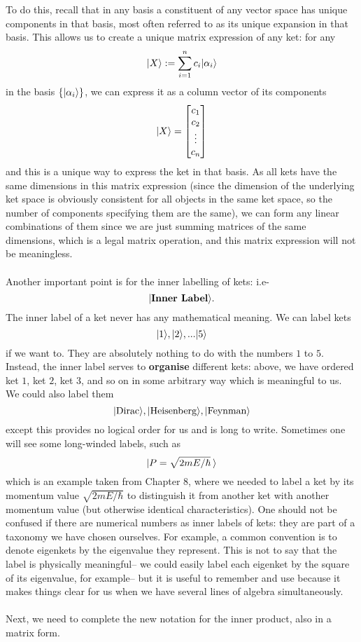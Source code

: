 \\\\
To do this, recall that in any basis a constituent of any vector space has unique components in that basis, most often referred to as its unique expansion in that basis. This allows us to create a unique matrix expression of any ket: for any
$$
|X\rangle:=\sum_{i=1}^{n}c_{i}|\alpha_{i}\rangle
$$
in the basis $\{|\alpha_{i}\rangle\}$, we can express it as a column vector of its components
$$
|X\rangle=\begin{bmatrix}
c_{1}\\
c_{2}\\
\vdots\\
c_{n}\\
\end{bmatrix}
$$
and this is a unique way to express the ket in that basis. As all kets have the same dimensions in this matrix expression (since the dimension of the underlying ket space is obviously consistent for all objects in the same ket space, so the number of components specifying them are the same), we can form any linear combinations of them since we are just summing matrices of the same dimensions, which is a legal matrix operation, and this matrix expression will not be meaningless.
\\\\
Another important point is for the inner labelling of kets: i.e-
$$
|\textbf{Inner Label}\rangle.
$$
The inner label of a ket never has any mathematical meaning. We can label kets 
$$
|1\rangle, |2\rangle, ... |5\rangle
$$
if we want to. They are absolutely nothing to do with the numbers $1$ to $5$. Instead, the inner label serves to \textbf{organise} different kets: above, we have ordered ket $1$, ket $2$, ket $3$, and so on in some arbitrary way which is meaningful to us. We could also label them
$$
|\text{Dirac}\rangle, |\text{Heisenberg}\rangle, |\text{Feynman}\rangle
$$
except this provides no logical order for us and is long to write. Sometimes one will see some long-winded labels, such as 
$$
|P=\sqrt{{2mE}/{\hbar}}\:\rangle
$$
which is an example taken from Chapter 8, where we needed to label a ket by its momentum value $\sqrt{{2mE}/{\hbar}}$ to distinguish it from another ket with another momentum value (but otherwise identical characteristics). One should not be confused if there are numerical numbers as inner labels of kets: they are part of a taxonomy we have chosen ourselves. For example, a common convention is to denote eigenkets by the eigenvalue they represent. This is not to say that the label is physically meaningful-- we could easily label each eigenket by the square of its eigenvalue, for example-- but it is useful to remember and use because it makes things clear for us when we have several lines of algebra simultaneously. 
\\\\
Next, we need to complete the new notation for the inner product, also in a matrix form. 
